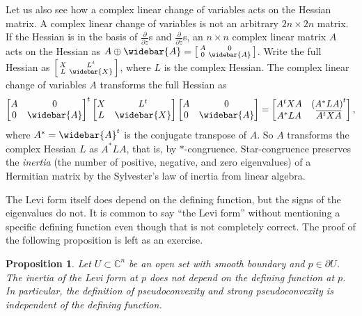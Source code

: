 \documentclass[12pt,openany]{book}
\newcommand{\C}{{\mathbb{C}}}
\newcommand{\myindex}[1]{#1\index{#1}}
\theoremstyle{plain}
\newtheorem{prop}[thm]{Proposition}
\theoremstyle{remark}
\theoremstyle{definition}
\theoremstyle{exercise}
\theoremstyle{example}
\begin{document}
Let us also see how a complex linear change of variables
acts on the Hessian matrix.  A complex linear change of variables is not an
arbitrary $2n \times 2n$ matrix.  If the Hessian is in the 
basis of $\frac{\partial}{\partial z}$s and
$\frac{\partial}{\partial \bar{z}}$s, an $n \times n$ complex linear matrix $A$
acts on the Hessian as $A \oplus \widebar{A} = 
\left[ \begin{smallmatrix} A & 0 \\ 0 & \widebar{A} \end{smallmatrix}
\right]$.
Write the full Hessian as
$\left[ \begin{smallmatrix} X & L^t \\ L & \widebar{X} \end{smallmatrix}
\right]$, where $L$ is the complex Hessian.  The complex linear change
of variables $A$ transforms
the full Hessian as
\begin{equation*}
{\begin{bmatrix} A & 0 \\ 0 & \widebar{A} \end{bmatrix}}^t
\begin{bmatrix} X & L^t \\ L & \widebar{X} \end{bmatrix}
\begin{bmatrix} A & 0 \\ 0 & \widebar{A} \end{bmatrix}
=
\begin{bmatrix} A^tXA & {(A^*LA)}^t \\ A^*LA & \overline{A^tXA} \end{bmatrix} ,
\end{equation*}
%
where $A^* = \widebar{A}^t$ is the conjugate
transpose of $A$.
So $A$
transforms the complex Hessian $L$ as $A^* L A$, that is, by $*$-congruence.
Star-congruence preserves the \emph{\myindex{inertia}}
(the number of positive, negative, and zero eigenvalues)
of a Hermitian matrix
by the Sylvester's law of inertia from linear algebra.

The Levi form itself does depend on the defining function, but the signs of
the eigenvalues do not.  It is common to say ``the
Levi form'' without mentioning a specific defining function
even though that is not completely correct.
The proof of the following proposition is left as an exercise.

\begin{prop} \label{prop:inertiainvariant}
Let $U \subset \C^n$ be an open set with smooth boundary and $p \in \partial
U$.  The inertia  of the Levi form at $p$
does not depend on the defining function at $p$.
In particular, the definition of pseudoconvexity and strong pseudoconvexity is
independent of the defining function.
\end{prop}
\end{document}
